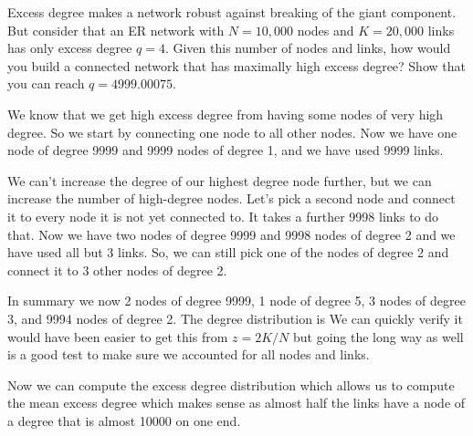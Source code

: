 
Excess degree makes a network robust against breaking of the giant component. But consider that an ER network with $N=10,000$ nodes and $K=20,000$ links has only excess degree $q=4$. Given this number of nodes and links, how would you build a connected network that has maximally high excess degree? Show that you can reach $q=4999.00075$. 

\solution
We know that we get high excess degree from having some nodes of very high degree. So we start by connecting one node to all other nodes. Now we have one node of degree 9999 and 9999 nodes of degree 1, and we have used 9999 links. 

We can't increase the degree of our highest degree node further, but we can increase the number of high-degree nodes. Let's pick a second node and connect it to every node it is not yet connected to. It takes a further 9998 links to do that. Now we have two nodes of degree 9999 and 9998 nodes of degree 2 and we have used all but 3 links. So, we can still pick one of the nodes of degree 2 and connect it to 3 other nodes of degree 2. 

In summary we now 2 nodes of degree 9999, 1 node of degree 5, 3 nodes of degree 3, and 9994 nodes of degree 2. The degree distribution is 
We can quickly verify 
it would have been easier to get this from $z=2K/N$ but going the long way as well is a good test to make sure we accounted for all nodes and links. 

Now we can compute the excess degree distribution
which allows us to compute the mean excess degree
which makes sense as almost half the links have a node of a degree that is almost 10000 on one end.
